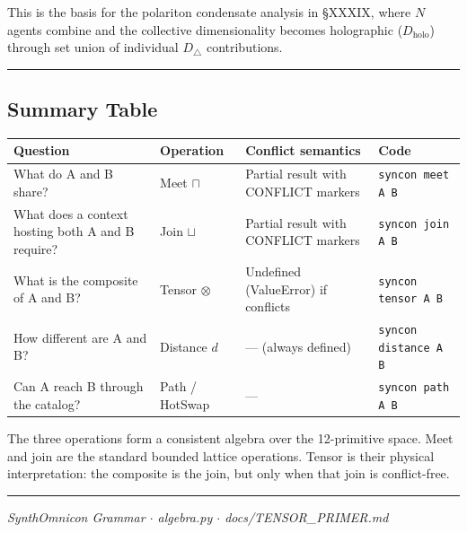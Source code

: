 \documentclass[12pt,a4paper]{article}
\newcommand{\pilcrow}{\S}
\begin{document}
This is the basis for the polariton condensate analysis in \pilcrow{}XXXIX, where $N$ agents combine and the collective dimensionality becomes holographic ($D_\text{holo}$) through set union of individual $D_{\triangle}$ contributions.

\begin{center}
\rule{0.5\textwidth}{0.4pt}
\end{center}

\subsection{Summary Table}

\begin{table}[htbp]
\centering
\small
{}
\begin{tabularx}{\textwidth}{>{\centering\arraybackslash}X >{\centering\arraybackslash}X >{\centering\arraybackslash}X >{\centering\arraybackslash}X}
\toprule
\rowcolor{gray!25}\textbf{Question} & \textbf{Operation} & \textbf{Conflict semantics} & \textbf{Code} \\
\midrule
\rowcolors{1}{white}{gray!10}
What do A and B share? & Meet $\sqcap$ & Partial result with CONFLICT markers & \texttt{syncon meet A B} \\
What does a context hosting both A and B require? & Join $\sqcup$ & Partial result with CONFLICT markers & \texttt{syncon join A B} \\
What is the composite of A and B? & Tensor $\otimes$ & Undefined (ValueError) if conflicts & \texttt{syncon tensor A B} \\
How different are A and B? & Distance $d$ & --- (always defined) & \texttt{syncon distance A B} \\
Can A reach B through the catalog? & Path / HotSwap & --- & \texttt{syncon path A B} \\
\bottomrule
\end{tabularx}
\end{table}

The three operations form a consistent algebra over the 12-primitive space. Meet and join are the standard bounded lattice operations. Tensor is their physical interpretation: the composite is the join, but only when that join is conflict-free.

\begin{center}
\rule{0.5\textwidth}{0.4pt}
\end{center}

\emph{SynthOmnicon Grammar $\cdot$ algebra.py $\cdot$ docs/TENSOR\_PRIMER.md}
\end{document}
